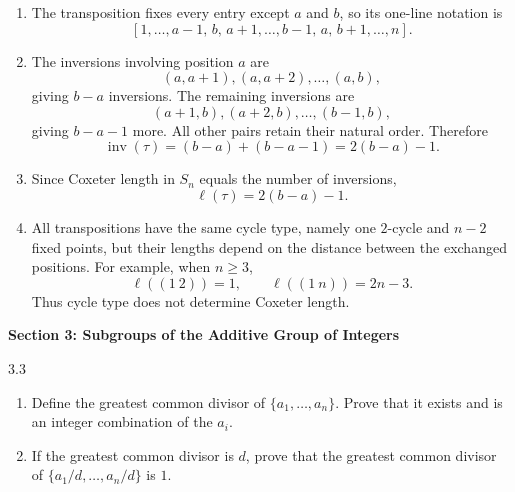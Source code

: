 \documentclass[11pt]{article}
\newcommand{\sectionheading}[1]{%
  \vspace{0.25em}
  {\color{darkgray}\large\bfseries #1}\par
}
\begin{document}
\begin{solution}
\begin{enumerate}[label=\textbf{(\alph*)}]
  \item The transposition fixes every entry except $a$ and $b$, so its
  one-line notation is
  \[
  [1,\ldots,a-1,\,b,\,a+1,\ldots,b-1,\,a,\,b+1,\ldots,n].
  \]

  \item The inversions involving position $a$ are
  \[
    (a,a+1),(a,a+2),\ldots,(a,b),
  \]
  giving $b-a$ inversions.  The remaining inversions are
  \[
    (a+1,b),(a+2,b),\ldots,(b-1,b),
  \]
  giving $b-a-1$ more.  All other pairs retain their natural order.
  Therefore
  \[
    \operatorname{inv}(\tau)=(b-a)+(b-a-1)=2(b-a)-1.
  \]

  \item Since Coxeter length in $S_n$ equals the number of inversions,
  \[
    \boxed{\ell(\tau)=2(b-a)-1}.
  \]

  \item All transpositions have the same cycle type, namely one $2$-cycle
  and $n-2$ fixed points, but their lengths depend on the distance between
  the exchanged positions.  For example, when $n\geq3$,
  \[
    \ell((1\ 2))=1,
    \qquad
    \ell((1\ n))=2n-3.
  \]
  Thus cycle type does not determine Coxeter length.
\end{enumerate}
\end{solution}

\sectionheading{Section 3: Subgroups of the Additive Group of Integers}

\begin{exercise}{3.3}
\begin{enumerate}[label=\textbf{(\alph*)}]
  \item Define the greatest common divisor of $\{a_1,\ldots,a_n\}$.
        Prove that it exists and is an integer combination of the $a_i$.
  \item If the greatest common divisor is $d$, prove that the greatest
        common divisor of $\{a_1/d,\ldots,a_n/d\}$ is $1$.
\end{enumerate}
\end{exercise}
\end{document}
